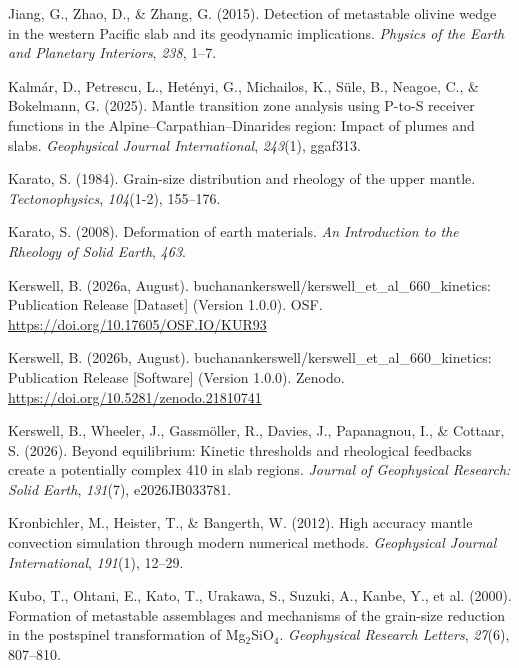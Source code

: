 \documentclass[draft,linenumbers]{agujournal2019}
\newlength{\cslhangindent}
\newenvironment{CSLReferences}[2]
 {\begin{list}{}{
  \setlength{\itemindent}{0pt}
  \setlength{\leftmargin}{0pt}
  \setlength{\parsep}{0pt}
  \ifodd #1
   \setlength{\leftmargin}{\cslhangindent}
   \setlength{\itemindent}{-\cslhangindent}
  \fi
  \setlength{\itemsep}{#2\baselineskip}
  }
  \item\relax}
 {\end{list}}
\begin{document}
\begin{CSLReferences}{1}{0}
Jiang, G., Zhao, D., \& Zhang, G. (2015). Detection of metastable
olivine wedge in the western {Pacific} slab and its geodynamic
implications. \emph{Physics of the Earth and Planetary Interiors},
\emph{238}, 1--7.

Kalmár, D., Petrescu, L., Hetényi, G., Michailos, K., Süle, B., Neagoe,
C., \& Bokelmann, G. (2025). Mantle transition zone analysis using
{P-to-S} receiver functions in the {Alpine--Carpathian--Dinarides}
region: Impact of plumes and slabs. \emph{Geophysical Journal
International}, \emph{243}(1), ggaf313.

Karato, S. (1984). Grain-size distribution and rheology of the upper
mantle. \emph{Tectonophysics}, \emph{104}(1-2), 155--176.

Karato, S. (2008). Deformation of earth materials. \emph{An Introduction
to the Rheology of Solid Earth}, \emph{463}.

Kerswell, B. (2026a, August).
{buchanankerswell/kerswell\_et\_al\_660\_kinetics: Publication Release
{[}Dataset{]}} (Version 1.0.0). OSF.
\url{https://doi.org/10.17605/OSF.IO/KUR93}

Kerswell, B. (2026b, August).
{buchanankerswell/kerswell\_et\_al\_660\_kinetics: Publication Release
{[}Software{]}} (Version 1.0.0). Zenodo.
\url{https://doi.org/10.5281/zenodo.21810741}

Kerswell, B., Wheeler, J., Gassmöller, R., Davies, J., Papanagnou, I.,
\& Cottaar, S. (2026). Beyond equilibrium: Kinetic thresholds and
rheological feedbacks create a potentially complex 410 in slab regions.
\emph{Journal of Geophysical Research: Solid Earth}, \emph{131}(7),
e2026JB033781.

Kronbichler, M., Heister, T., \& Bangerth, W. (2012). High accuracy
mantle convection simulation through modern numerical methods.
\emph{Geophysical Journal International}, \emph{191}(1), 12--29.

Kubo, T., Ohtani, E., Kato, T., Urakawa, S., Suzuki, A., Kanbe, Y., et
al. (2000). Formation of metastable assemblages and mechanisms of the
grain-size reduction in the postspinel transformation of
{Mg\(_2\)SiO\(_4\)}. \emph{Geophysical Research Letters}, \emph{27}(6),
807--810.


\end{CSLReferences}
\end{document}
